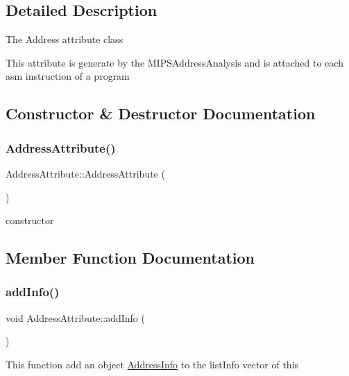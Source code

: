 \subsection{Detailed Description}
The Address attribute class

This attribute is generate by the M\+I\+P\+S\+Address\+Analysis and is attached to each asm instruction of a program 

\subsection{Constructor \& Destructor Documentation}
\mbox{\label{classAddressAttribute_ace33470ed7a894142633a223b64378af}} 
\subsubsection{\texorpdfstring{Address\+Attribute()}{AddressAttribute()}}
{\footnotesize\ttfamily Address\+Attribute\+::\+Address\+Attribute (\begin{DoxyParamCaption}{ }\end{DoxyParamCaption})}

constructor 

\subsection{Member Function Documentation}
\mbox{\label{classAddressAttribute_aaa60489ef43cad77278ef19325dcd18c}} 
\subsubsection{\texorpdfstring{add\+Info()}{addInfo()}}
{\footnotesize\ttfamily void Address\+Attribute\+::add\+Info (\begin{DoxyParamCaption}\item[{\hyperlink{classAddressInfo}{Address\+Info}}]{ }\end{DoxyParamCaption})}

This function add an object \hyperlink{classAddressInfo}{Address\+Info} to the list\+Info vector of this \mbox{\label{classAddressAttribute_ab418a5c40c38661892b790274dac50a0}} 
